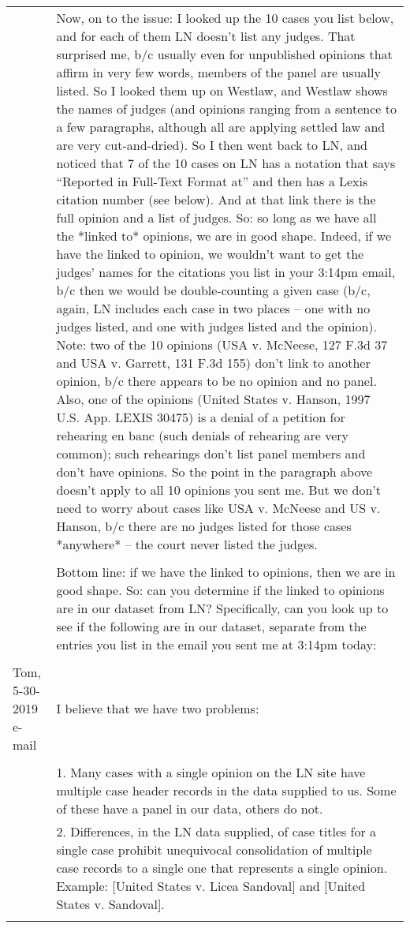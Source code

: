 \documentclass[10pt, letterpaper]{article}
\begin{document}
\begin{spacing}{1.0}
\begin{longtable}{p{1.5in}p{5in}}
    &Now, on to the issue: I looked up the 10 cases you list below, and for each of them LN doesn’t list any judges. That surprised me, b/c usually even for unpublished opinions that affirm in very few words, members of the panel are usually listed. So I looked them up on Westlaw, and Westlaw shows the names of judges (and opinions ranging from a sentence to a few paragraphs, although all are applying settled law and are very cut-and-dried). So I then went back to LN, and noticed that 7 of the 10 cases on LN has a notation that says “Reported in Full-Text Format at” and then has a Lexis citation number (see below). And at that link there is the full opinion and a list of judges. So: so long as we have all the *linked to* opinions, we are in good shape. Indeed, if we have the linked to opinion, we wouldn’t want to get the judges’ names for the citations you list in your 3:14pm email, b/c then we would be double-counting a given case (b/c, again, LN includes each case in two places – one with no judges listed, and one with judges listed and the opinion).
    Note: two of the 10 opinions (USA v. McNeese, 127 F.3d 37 and USA v. Garrett, 131 F.3d 155) don’t link to another opinion, b/c there appears to be no opinion and no panel. Also, one of the opinions (United States v. Hanson, 1997 U.S. App. LEXIS 30475) is a denial of a petition for rehearing en banc (such denials of rehearing are very common); such rehearings don’t list panel members and don’t have opinions. So the point in the paragraph above doesn’t apply to all 10 opinions you sent me. But we don’t need to worry about cases like USA v. McNeese and US v. Hanson, b/c there are no judges listed for those cases *anywhere* -- the court never listed the judges.\\\\
    
    &Bottom line: if we have the linked to opinions, then we are in good shape. So: can you determine if the linked to opinions are in our dataset from LN? Specifically, can you look up to see if the following are in our dataset, separate from the entries you list in the email you sent me at 3:14pm today:\\\\
    
    
    
    
    Tom, 5-30-2019 e-mail & I believe that we have two problems:\\\\
    
    &1. Many cases with a single opinion on the LN site have multiple case header records in the data supplied to us.  Some of these have a panel in our data, others do not.\\
    &2. Differences, in the LN data supplied, of case titles for a single case prohibit unequivocal consolidation of multiple case records to a single one that represents a single opinion.  Example:  [United States v. Licea Sandoval] and [United States v. Sandoval].\\\\
    

\end{longtable}
\end{spacing}
\end{document}

